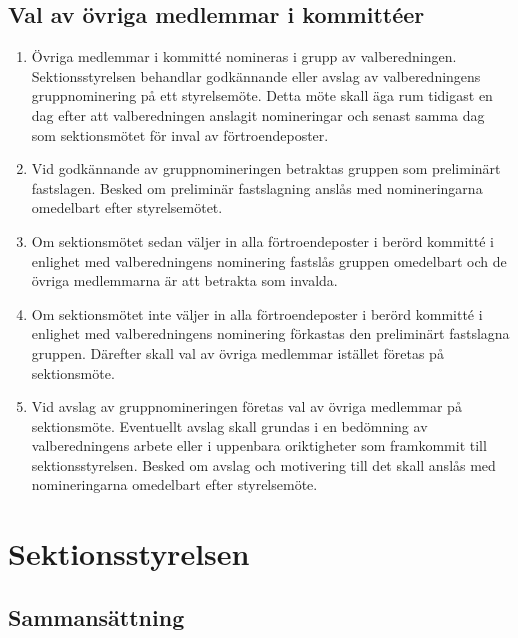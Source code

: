 \documentclass[11pt,a4paper]{article}
\begin{document}
\subsection{Val av övriga medlemmar i kommittéer}
	\begin{enumerate}[\thesubsection .1]
	
	\item Övriga medlemmar i kommitté nomineras i grupp av valberedningen. Sektionsstyrelsen
	behandlar godkännande eller avslag av valberedningens gruppnominering på ett styrelsemöte. Detta
	möte skall äga rum tidigast en dag efter att valberedningen anslagit nomineringar och senast samma
	dag som sektionsmötet för inval av förtroendeposter.
	
	\item Vid godkännande av gruppnomineringen betraktas gruppen som preliminärt fastslagen.
	Besked om preliminär fastslagning anslås med nomineringarna omedelbart efter styrelsemötet.
	
	\item Om sektionsmötet sedan väljer in alla förtroendeposter i berörd kommitté i enlighet med
	valberedningens nominering fastslås gruppen omedelbart och de övriga medlemmarna är att betrakta
	som invalda.
	
	\item Om sektionsmötet inte väljer in alla förtroendeposter i berörd kommitté i enlighet med
	valberedningens nominering förkastas den preliminärt fastslagna gruppen. Därefter skall val av
	övriga medlemmar istället företas på sektionsmöte.
	
	\item Vid avslag av gruppnomineringen företas val av övriga medlemmar på sektionsmöte. Eventuellt
	avslag skall grundas i en bedömning av valberedningens arbete eller i uppenbara oriktigheter
	som framkommit till sektionsstyrelsen. Besked om avslag och motivering till det skall anslås med
	nomineringarna omedelbart efter styrelsemöte.

	\end{enumerate}

\newpage

\section{Sektionsstyrelsen}

\subsection{Sammansättning}
\end{document}
